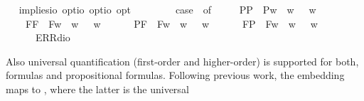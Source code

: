\begin{isabellebody}
\ \isamarkupfalse%
\ implies{\isacharcolon}{\isacharcolon}{\isachardoublequoteopen}io\ opt{\isasymRightarrow}io\ opt{\isasymRightarrow}io\ opt{\isachardoublequoteclose}\ {\isacharparenleft}\ {\isachardoublequoteopen}\isactrlbold {\isasymrightarrow}{\isachardoublequoteclose}\ {}{}{\isacharparenright}\ \ {\isachardoublequoteopen}{\isasymphi}\ \isactrlbold {\isasymrightarrow}\ {\isasympsi}\ {\isasymequiv}\ case\ {\isacharparenleft}{\isasymphi}{\isacharcomma}{\isasympsi}{\isacharparenright}\ of\ \isanewline
\ \ \ \ {\isacharparenleft}P{\isacharparenleft}{\isasymalpha}{\isacharparenright}{\isacharcomma}P{\isacharparenleft}{\isasymbeta}{\isacharparenright}{\isacharparenright}\ {\isasymRightarrow}\ P{\isacharparenleft}{\isasymlambda}w{\isachardot}\ {\isasymalpha}\ w\ {\isasymlongrightarrow}\ {\isasymbeta}\ w{\isacharparenright}\ {\isacharbar}\ \isanewline
\ \ \ \ {\isacharparenleft}F{\isacharparenleft}{\isasymalpha}{\isacharparenright}{\isacharcomma}F{\isacharparenleft}{\isasymbeta}{\isacharparenright}{\isacharparenright}\ {\isasymRightarrow}\ F{\isacharparenleft}{\isasymlambda}w{\isachardot}\ {\isasymalpha}\ w\ {\isasymlongrightarrow}\ {\isasymbeta}\ w{\isacharparenright}\ {\isacharbar}\ \isanewline
\ \ \ \ {\isacharparenleft}P{\isacharparenleft}{\isasymalpha}{\isacharparenright}{\isacharcomma}F{\isacharparenleft}{\isasymbeta}{\isacharparenright}{\isacharparenright}\ {\isasymRightarrow}\ F{\isacharparenleft}{\isasymlambda}w{\isachardot}\ {\isasymalpha}\ w\ {\isasymlongrightarrow}\ {\isasymbeta}\ w{\isacharparenright}\ {\isacharbar}\ \isanewline
\ \ \ \ {\isacharparenleft}F{\isacharparenleft}{\isasymalpha}{\isacharparenright}{\isacharcomma}P{\isacharparenleft}{\isasymbeta}{\isacharparenright}{\isacharparenright}\ {\isasymRightarrow}\ F{\isacharparenleft}{\isasymlambda}w{\isachardot}\ {\isasymalpha}\ w\ {\isasymlongrightarrow}\ {\isasymbeta}\ w{\isacharparenright}\ {\isacharbar}\ \isanewline
\ \ \ \ {\isacharunderscore}\ {\isasymRightarrow}\ ERR{\isacharparenleft}dio{\isacharparenright}{\isachardoublequoteclose}%
\begin{isamarkuptext}%
Also universal quantification  (first-order and higher-order) is supported 
  for both, formulas  and propositional formulas. Following previous work, the embedding maps 
   to , where the latter \isa{{\isasymforall}} is the universal 

\end{isamarkuptext}
\end{isabellebody}
